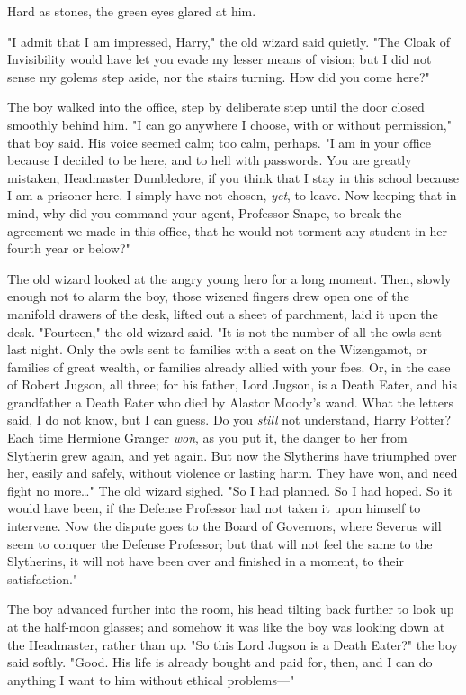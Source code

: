Hard as stones, the green eyes glared at him.

"I admit that I am impressed, Harry," the old wizard said quietly. "The Cloak 
of Invisibility would have let you evade my lesser means of vision; but I did 
not sense my golems step aside, nor the stairs turning. How did you come here?"

The boy walked into the office, step by deliberate step until the door closed 
smoothly behind him. "I can go anywhere I choose, with or without permission," 
that boy said. His voice seemed calm; too calm, perhaps. "I am in your office 
because I decided to be here, and to hell with passwords. You are greatly 
mistaken, Headmaster Dumbledore, if you think that I stay in this school 
because I am a prisoner here. I simply have not chosen, \emph{yet}, to leave. 
Now keeping that in mind, why did you command your agent, Professor Snape, to 
break the agreement we made in this office, that he would not torment any 
student in her fourth year or below?"

The old wizard looked at the angry young hero for a long moment. Then, slowly 
enough not to alarm the boy, those wizened fingers drew open one of the 
manifold drawers of the desk, lifted out a sheet of parchment, laid it upon the 
desk. "Fourteen," the old wizard said. "It is not the number of all the owls 
sent last night. Only the owls sent to families with a seat on the Wizengamot, 
or families of great wealth, or families already allied with your foes. Or, in 
the case of Robert Jugson, all three; for his father, Lord Jugson, is a Death 
Eater, and his grandfather a Death Eater who died by Alastor Moody's wand. What 
the letters said, I do not know, but I can guess. Do you \emph{still} not 
understand, Harry Potter? Each time Hermione Granger \emph{won}, as you put it, 
the danger to her from Slytherin grew again, and yet again. But now the 
Slytherins have triumphed over her, easily and safely, without violence or 
lasting harm. They have won, and need fight no more{\ldots}" The old wizard 
sighed. "So I had planned. So I had hoped. So it would have been, if the 
Defense Professor had not taken it upon himself to intervene. Now the dispute 
goes to the Board of Governors, where Severus will seem to conquer the Defense 
Professor; but that will not feel the same to the Slytherins, it will not have 
been over and finished in a moment, to their satisfaction."

The boy advanced further into the room, his head tilting back further to look 
up at the half-moon glasses; and somehow it was like the boy was looking down 
at the Headmaster, rather than up. "So this Lord Jugson is a Death Eater?" the 
boy said softly. "Good. His life is already bought and paid for, then, and I 
can do anything I want to him without ethical problems---"

